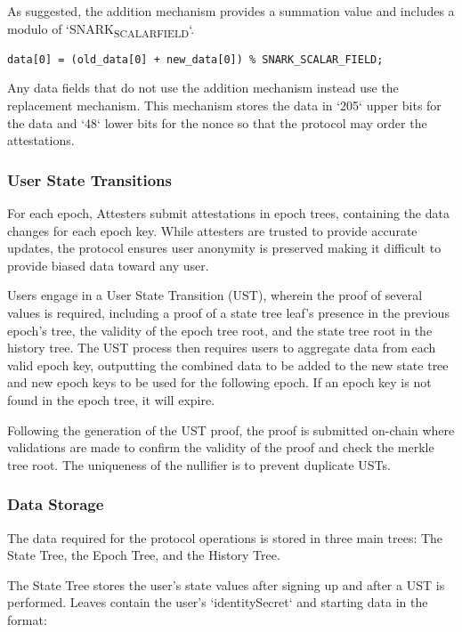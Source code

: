\documentclass[11pt]{article}
\begin{document}
As suggested, the addition mechanism provides a summation value and includes a modulo of `SNARK\textsubscript{SCALAR}\textsubscript{FIELD}`.

\begin{verbatim}
data[0] = (old_data[0] + new_data[0]) % SNARK_SCALAR_FIELD;
\end{verbatim}

Any data fields that do not use the addition mechanism instead use the replacement mechanism. This mechanism stores the data in `205` upper bits for the data and `48` lower bits for the nonce so that the protocol may order the attestations.
\subsubsection{User State Transitions}
\label{sec:orgbac732d}

For each epoch, Attesters submit attestations in epoch trees, containing the data changes for each epoch key. While attesters are trusted to provide accurate updates, the protocol ensures user anonymity is preserved making it difficult to provide biased data toward any user.

Users engage in a User State Transition (UST), wherein the proof of several values is required, including a proof of a state tree leaf's presence in the previous epoch's tree, the validity of the epoch tree root, and the state tree root in the history tree. The UST process then requires users to aggregate data from each valid epoch key, outputting the combined data to be added to the new state tree and new epoch keys to be used for the following epoch. If an epoch key is not found in the epoch tree, it will expire.

Following the generation of the UST proof, the proof is submitted on-chain where validations are made to confirm the validity of the proof and check the merkle tree root. The uniqueness of the nullifier is to prevent duplicate USTs.
\subsubsection{Data Storage}
\label{sec:org5a2a9ab}

The data required for the protocol operations is stored in three main trees: The State Tree, the Epoch Tree, and the History Tree.

The State Tree stores the user's state values after signing up and after a UST is performed. Leaves contain the user's `identitySecret` and starting data in the format:
\end{document}
